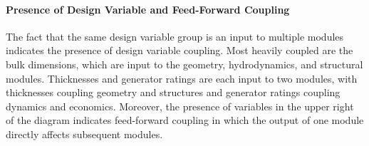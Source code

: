     \paragraph{Presence of Design Variable and Feed-Forward Coupling}
    The fact that the same design variable group is an input to multiple modules indicates the presence of design variable coupling.
    Most heavily coupled are the bulk dimensions, which are input to the geometry, hydrodynamics, and structural modules.
    Thicknesses and generator ratings are each input to two modules, with thicknesses coupling geometry and structures and generator ratings coupling dynamics and economics.
    Moreover, the presence of variables in the upper right of the diagram indicates feed-forward coupling in which the output of one module directly affects subsequent modules.
    
